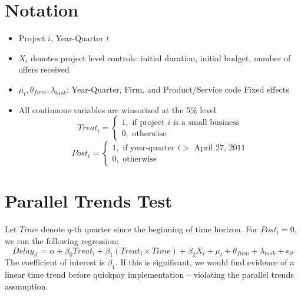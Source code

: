 \documentclass[
]{article}
\providecommand{\tightlist}{%
  \setlength{\itemsep}{0pt}\setlength{\parskip}{0pt}}
\begin{document}
\hypertarget{notation}{%
\section{Notation}\label{notation}}

\begin{itemize}
\tightlist
\item
  Project \(i\), Year-Quarter \(t\)
\item
  \(X_i\) denotes project level controls: initial duration, initial
  budget, number of offers received
\item
  \(\mu_t,\theta_{firm},\lambda_{task}\): Year-Quarter, Firm, and
  Product/Service code Fixed effects
\item
  All continuous variables are winsorized at the 5\% level
  \[ Treat_i = \begin{cases} 1, \text{ if project } i \text{ is a small business}\\
  0, \text{ otherwise} \end{cases}\]
  \[ Post_t = \begin{cases} 1, \text{ if year-quarter } t > \text{ April 27, 2011}\\
  0, \text{ otherwise} \end{cases}\]
\end{itemize}

\hypertarget{parallel-trends-test}{%
\section{Parallel Trends Test}\label{parallel-trends-test}}

Let \(Time\) denote \(q\)-th quarter since the beginning of time
horizon. For \(Post_t =0\), we run the following regression:
\[ Delay_{it} = \alpha+\beta_0 Treat_i + \beta_1 (Treat_i \times Time) + \beta_2 X_i + \mu_t + \theta_{firm} + \lambda_{task} +\epsilon_{it}\]
The coefficient of interest is \(\beta_1\). If this is significant, we
would find evidence of a linear time trend before quickpay
implementation -- violating the parallel trends assumption.
\end{document}
